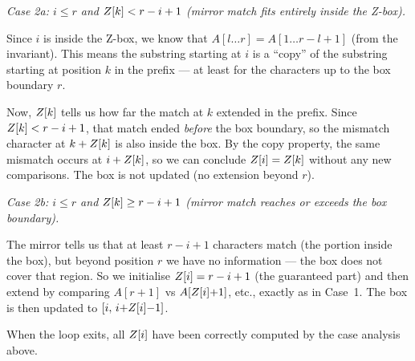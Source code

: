 \begin{formaldetails}
\begin{loopproof}
                         \medskip
                         \textit{Case 2a: $i \le r$ and $Z\kern0pt[k] < r - i + 1$
                         (mirror match fits entirely inside the Z-box).}

                         Since $i$ is inside the Z-box, we know that
                         $A[l\ldots r] = A[1\ldots r{-}l{+}1]$ (from the
                         invariant).
                         This means the substring starting at $i$ is a
                         ``copy'' of the substring starting at position $k$
                         in the prefix --- at least for the characters up to
                         the box boundary $r$.

                         Now, $Z\kern0pt[k]$ tells us how far the match at
                         $k$ extended in the prefix.
                         Since $Z\kern0pt[k] < r - i + 1$, that match ended
                         \emph{before} the box boundary, so the mismatch
                         character at $k + Z\kern0pt[k]$ is also inside the
                         box.
                         By the copy property, the same mismatch occurs at
                         $i + Z\kern0pt[k]$, so we can conclude
                         $Z\kern0pt[i] = Z\kern0pt[k]$ without any new
                         comparisons.
                         The box is not updated (no extension beyond $r$).
                         \checkmark

                         \medskip
                         \textit{Case 2b: $i \le r$ and $Z\kern0pt[k] \ge r - i + 1$
                         (mirror match reaches or exceeds the box boundary).}

                         The mirror tells us that at least $r - i + 1$
                         characters match (the portion inside the box), but
                         beyond position $r$ we have no information --- the
                         box does not cover that region.
                         So we initialise $Z\kern0pt[i] = r - i + 1$ (the
                         guaranteed part) and then extend by comparing
                         $A[r{+}1]$ vs $A[Z\kern0pt[i]{+}1]$, etc., exactly
                         as in Case~1.
                         The box is then updated to
                         $[i,\, i{+}Z\kern0pt[i]{-}1]$. \checkmark

    \item[Postcondition] When the loop exits, all $Z\kern0pt[i]$ have been correctly
                         computed by the case analysis above. \checkmark
  \end{loopproof}
\end{formaldetails}

